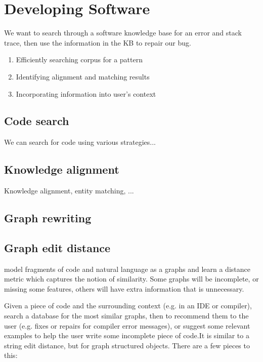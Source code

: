 \documentclass[11pt]{article}
\begin{document}
    \section{Developing Software}\label{sec:applications}

    We want to search through a software knowledge base for an error and stack trace, then use the information in the KB to repair our bug.

    \begin{enumerate}
        \item Efficiently searching corpus for a pattern
        \item Identifying alignment and matching results
        \item Incorporating information into user's context
    \end{enumerate}


    \subsection{Code search}

    We can search for code using various strategies...

    \subsection{Knowledge alignment}

    Knowledge alignment, entity matching, ...

    \subsection{Graph rewriting}

    \subsection{Graph edit distance}

    model fragments of code and natural language as a graphs and learn a distance metric which captures the notion of similarity. Some graphs will be incomplete, or missing some features, others will have extra information that is unnecessary.

    Given a piece of code and the surrounding context (e.g. in an IDE or compiler), search a database for the most similar graphs, then to recommend them to the user (e.g. fixes or repairs for compiler error messages), or suggest some relevant examples to help the user write some incomplete piece of code.It is similar to a string edit distance, but for graph structured objects. There are a few pieces to this:
\end{document}
